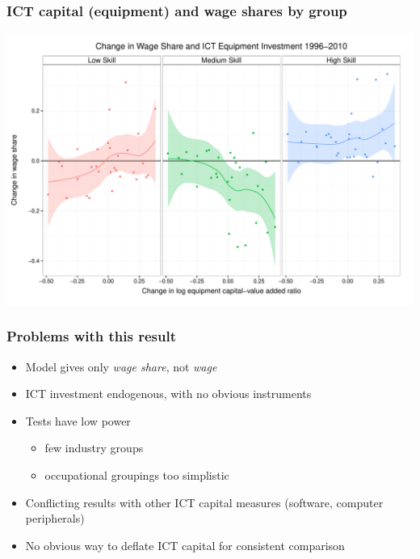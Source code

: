 \documentclass[red]{beamer}
\newcommand{\vitem}{\vfill\item}
\begin{document}
\begin{frame}[c]
  \frametitle{ICT capital (equipment) and wage shares by group}
\begin{center}
\includegraphics[width=\textwidth]{slides_fig/wage_share_equipment_skill.pdf}
\end{center}
\end{frame}

\begin{frame}[c]
  \frametitle{Problems with this result}
  \begin{itemize}
    \vitem Model gives only {\em wage share}, not {\em wage}
    \pause
    \vitem ICT investment endogenous, with no obvious instruments
    \pause
    \vitem Tests have low power
    \begin{itemize}
      \item few industry groups
      \item occupational groupings too simplistic
    \end{itemize}
    \pause
    \vitem Conflicting results with other ICT capital measures 
           (software, computer peripherals)
    \pause
    \vitem No obvious way to deflate ICT capital for consistent comparison
  \end{itemize}
\end{frame}
\end{document}
